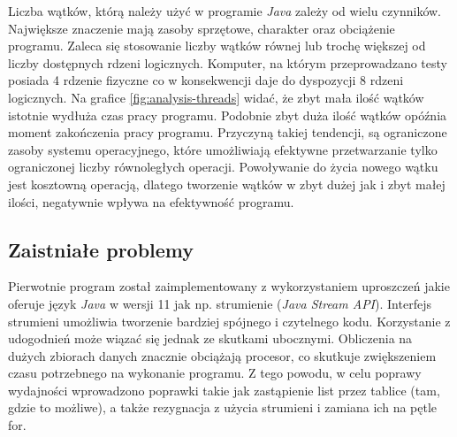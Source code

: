 \documentclass[12pt]{article}
\begin{document}
Liczba wątków, którą należy użyć w programie \textit{Java} zależy od wielu czynników. Największe znaczenie
mają zasoby sprzętowe, charakter oraz obciążenie programu.
Zaleca się stosowanie liczby wątków równej lub trochę większej od liczby dostępnych rdzeni logicznych.
Komputer, na którym przeprowadzano testy posiada 4 rdzenie fizyczne co w konsekwencji daje do
dyspozycji 8 rdzeni logicznych. Na grafice \ref{fig:analysis-threads} widać, że
zbyt mała ilość wątków istotnie wydłuża czas pracy programu.
Podobnie zbyt duża ilość wątków opóźnia moment zakończenia pracy programu. Przyczyną takiej tendencji, 
są ograniczone zasoby systemu operacyjnego, które umożliwiają
efektywne przetwarzanie tylko ograniczonej liczby równoległych operacji. Powoływanie do życia nowego wątku
jest kosztowną operacją, dlatego tworzenie wątków w zbyt dużej jak i zbyt małej ilości, negatywnie wpływa
na efektywność programu.

\subsection{Zaistniałe problemy}
Pierwotnie program został zaimplementowany z wykorzystaniem uproszczeń jakie oferuje język \textit{Java} w wersji 11
jak np. strumienie (\textit{Java Stream API}). Interfejs strumieni umożliwia tworzenie
bardziej spójnego i czytelnego kodu. Korzystanie z udogodnień może wiązać się jednak ze skutkami ubocznymi.
Obliczenia na dużych zbiorach danych znacznie obciążają procesor, co skutkuje zwiększeniem czasu
potrzebnego na wykonanie programu. Z tego powodu, w celu poprawy wydajności wprowadzono poprawki
takie jak zastąpienie list przez tablice (tam, gdzie to możliwe), a także rezygnacja
z użycia strumieni i zamiana ich na pętle for.
\end{document}
